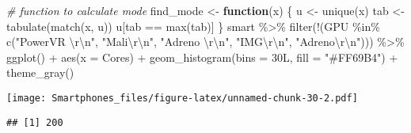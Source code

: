 \documentclass[
]{article}
\newenvironment{Shaded}{\begin{snugshade}}{\end{snugshade}}
\newcommand{\AttributeTok}[1]{\textcolor[rgb]{0.77,0.63,0.00}{#1}}
\newcommand{\CommentTok}[1]{\textcolor[rgb]{0.56,0.35,0.01}{\textit{#1}}}
\newcommand{\ControlFlowTok}[1]{\textcolor[rgb]{0.13,0.29,0.53}{\textbf{#1}}}
\newcommand{\FunctionTok}[1]{\textcolor[rgb]{0.00,0.00,0.00}{#1}}
\newcommand{\NormalTok}[1]{#1}
\newcommand{\OtherTok}[1]{\textcolor[rgb]{0.56,0.35,0.01}{#1}}
\newcommand{\SpecialCharTok}[1]{\textcolor[rgb]{0.00,0.00,0.00}{#1}}
\newcommand{\StringTok}[1]{\textcolor[rgb]{0.31,0.60,0.02}{#1}}
\begin{document}
\begin{Shaded}
\begin{Highlighting}[]
\CommentTok{\# function to calculate mode}
\NormalTok{find\_mode }\OtherTok{\textless{}{-}} \ControlFlowTok{function}\NormalTok{(x) \{}
\NormalTok{  u }\OtherTok{\textless{}{-}} \FunctionTok{unique}\NormalTok{(x)}
\NormalTok{  tab }\OtherTok{\textless{}{-}} \FunctionTok{tabulate}\NormalTok{(}\FunctionTok{match}\NormalTok{(x, u))}
\NormalTok{  u[tab }\SpecialCharTok{==} \FunctionTok{max}\NormalTok{(tab)]}
\NormalTok{\}}
\NormalTok{smart }\SpecialCharTok{\%\textgreater{}\%}
 \FunctionTok{filter}\NormalTok{(}\SpecialCharTok{!}\NormalTok{(GPU }\SpecialCharTok{\%in\%} \FunctionTok{c}\NormalTok{(}\StringTok{"PowerVR }\SpecialCharTok{\textbackslash{}r\textbackslash{}n}\StringTok{"}\NormalTok{, }\StringTok{"Mali}\SpecialCharTok{\textbackslash{}r\textbackslash{}n}\StringTok{"}\NormalTok{, }\StringTok{"Adreno }\SpecialCharTok{\textbackslash{}r\textbackslash{}n}\StringTok{"}\NormalTok{, }\StringTok{"IMG}\SpecialCharTok{\textbackslash{}r\textbackslash{}n}\StringTok{"}\NormalTok{, }\StringTok{"Adreno}\SpecialCharTok{\textbackslash{}r\textbackslash{}n}\StringTok{"}\NormalTok{))) }\SpecialCharTok{\%\textgreater{}\%}
 \FunctionTok{ggplot}\NormalTok{() }\SpecialCharTok{+}
  \FunctionTok{aes}\NormalTok{(}\AttributeTok{x =}\NormalTok{ Cores) }\SpecialCharTok{+}
  \FunctionTok{geom\_histogram}\NormalTok{(}\AttributeTok{bins =}\NormalTok{ 30L, }\AttributeTok{fill =} \StringTok{"\#FF69B4"}\NormalTok{) }\SpecialCharTok{+}
  \FunctionTok{theme\_gray}\NormalTok{()}
\end{Highlighting}
\end{Shaded}

\texttt{[image: Smartphones\_files/figure-latex/unnamed-chunk-30-2.pdf]}

\begin{Shaded}
\end{Shaded}

\begin{verbatim}
## [1] 200
\end{verbatim}
\end{document}
